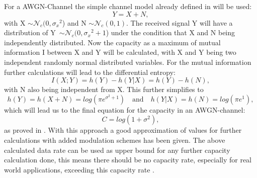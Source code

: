 For a \gls{AWGN}-Channel the simple channel model already defined in  will be used:
\begin{equation}
\label{eq:chanAWGN}
Y = X + N,   
\end{equation}
with X $\sim \mathcal{N}_c(0,{\sigma_{x}}^2$) and N $\sim \mathcal{N}_c(0,1)$. The received signal Y will have a distribution of \mbox{Y $\sim \mathcal{N}_c(0,{\sigma_{x}}^2+1$)} under the condition that X and N being independently distributed.
Now the capacity as a maximum of mutual information I between X and Y will be calculated, with X and Y being two independent randomly normal distributed variables.
\newline
For the mutual information further calculations will lead to the differential entropy:
\begin{equation}
I(X;Y) = h(Y) - h(Y|X)
= h(Y) - h(N),
\end{equation}
with N also being independent from X.
\newline
This further simplifies to 
\begin{equation}
h(Y) = h(X+N) = log(\pi e^{\sigma^2+1}) \quad \textrm{and} \quad h(Y|X) = h(N) = log(\pi e^{1}),
\end{equation}
which will lead us to the final equation for the capacity in an AWGN-channel:
\begin{equation}
\label{eq:AWGNcap}
C = log(1+\sigma^2),
\end{equation}
as proved in \cite{Kramer}.
\newline
With this approach a good approximation of values for further calculations with added modulation schemes has been given. The above calculated data rate can be used as upper bound for any further capacity calculation done, this means there should be no capacity rate, especially for real world applications, exceeding this capacity rate \cite{Shannon}.


